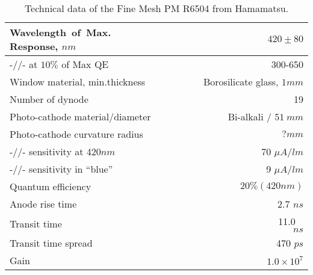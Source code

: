 \begin{table}[htbp]
\begin{center}
\begin{tabular}{|l|r|} \hline
Wavelength~of~Max. Response, $nm$  &      $420\pm80$ \\\hline
-//- at  $10\%$ of Max QE                & 300-650 \\\hline
Window material, min.thickness &   Borosilicate glass, $1mm$ \\\hline
Number of dynode   &   19\\\hline
Photo-cathode material/diameter & Bi-alkali / $51~mm$\\\hline
Photo-cathode curvature radius &   $? mm $\\\hline
-//- sensitivity at 420$nm$   &  70 $\mu A/lm$ \\\hline
-//- sensitivity in  ``blue''&  9 $\mu A/lm$\\\hline
Quantum efficiency & $20\%(420nm)$\\\hline
Anode rise time&~~~~~~~~~~~~~~~~~~~~2.7 $ns$\\\hline
Transit time &~~~~~~~~~~~~~~~~~~~~~~11.0 ~$ns$\\\hline
Transit time spread&~~~~~~~~~~~~~~~~470 $ps$\\ \hline
Gain & $1.0 \times 10^7$\\ \hline
\end{tabular}
\caption{Technical data of the Fine Mesh PM
 R6504 from Hamamatsu.\label{r6504}}
\end{center}
\end{table}

